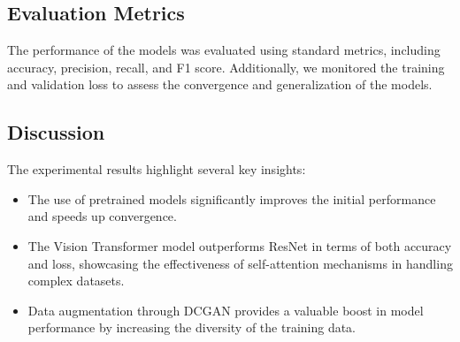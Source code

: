 
\subsection{Evaluation Metrics}
The performance of the models was evaluated using standard metrics, including accuracy, precision, recall, and F1 score. Additionally, we monitored the training and validation loss to assess the convergence and generalization of the models.




\subsection{Discussion}
The experimental results highlight several key insights:
\begin{itemize}
    \item The use of pretrained models significantly improves the initial performance and speeds up convergence.
    \item The Vision Transformer model outperforms ResNet in terms of both accuracy and loss, showcasing the effectiveness of self-attention mechanisms in handling complex datasets.
    \item Data augmentation through DCGAN provides a valuable boost in model performance by increasing the diversity of the training data.
\end{itemize}


